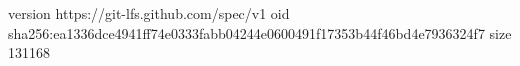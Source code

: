 version https://git-lfs.github.com/spec/v1
oid sha256:ea1336dce4941ff74e0333fabb04244e0600491f17353b44f46bd4e7936324f7
size 131168
